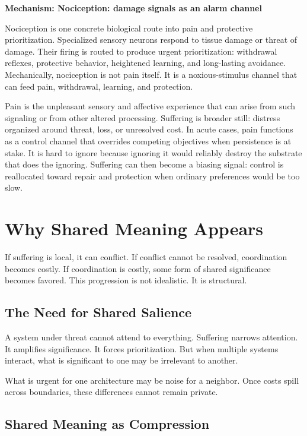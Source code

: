 \documentclass[11pt,twoside,openright]{book}
\newenvironment{mechanismbox}[1]
  {\begin{framed}\noindent\textbf{Mechanism: #1}\par\medskip}
  {\end{framed}}
\begin{document}
\begin{mechanismbox}{Nociception: damage signals as an alarm channel}

Nociception is one concrete biological route into pain and protective prioritization. Specialized sensory neurons respond to tissue damage or threat of damage. Their firing is routed to produce urgent prioritization: withdrawal reflexes, protective behavior, heightened learning, and long-lasting avoidance. Mechanically, nociception is not pain itself. It is a noxious-stimulus channel that can feed pain, withdrawal, learning, and protection.

Pain is the unpleasant sensory and affective experience that can arise from such signaling or from other altered processing. Suffering is broader still: distress organized around threat, loss, or unresolved cost. In acute cases, pain functions as a control channel that overrides competing objectives when persistence is at stake. It is hard to ignore because ignoring it would reliably destroy the substrate that does the ignoring. Suffering can then become a biasing signal: control is reallocated toward repair and protection when ordinary preferences would be too slow.

\end{mechanismbox}
\chapter{Why Shared Meaning Appears}
\label{ch:shared_meaning_appears}

If suffering is local, it can conflict. If conflict cannot be resolved, coordination becomes costly. If coordination is costly, some form of shared significance becomes favored. This progression is not idealistic. It is structural.

\section*{The Need for Shared Salience}

A system under threat cannot attend to everything. Suffering narrows attention. It amplifies significance. It forces prioritization. But when multiple systems interact, what is significant to one may be irrelevant to another.

What is urgent for one architecture may be noise for a neighbor. Once costs spill across boundaries, these differences cannot remain private.

\section*{Shared Meaning as Compression}
\end{document}
